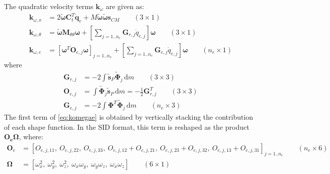 \documentclass[wes, manuscript]{copernicus}
\renewcommand{\d}{\mathrm{d}}
\renewcommand{\v}[1]{\boldsymbol{#1}}
\newcommand{\m}[1]{\boldsymbol{#1}}
\newcommand{\M} {{\m{M}}}
\newcommand{\stil}  {\m{\tilde{s}}}
\renewcommand{\d}{\mathrm{d}}
\newcommand{\dm}{\d{m}}
\begin{document}
The quadratic velocity terms $\v{k}_\omega$  are given as:
\begin{align}
  \v{k}_{\omega, x}       & = 2\v{\tilde{\omega}}  \v{C}_t^T \v{\dot{q}}_e
      + 
M\v{\tilde{\omega}} 
 \v{\tilde{\omega}} 
\v{s}_{CM}
 \qquad (3\times 1)
  \\
  \v{k}_{\omega, \theta}  & = \v{\tilde{\omega}}\M_{\theta\theta}\v{\omega}         
   +\left[\sum\limits_{j=1..n_e}  \v{G}_{r,j} \dot{q}_{e,j}\right] \v{\omega}
 \qquad (3\times 1)
  \\
  \v{k}_{\omega, e}   & =  \left[  \v{\omega}^T \m{O}_{e,j}\v{\omega}\right]_{j=1..n_e} 
  + 
    \left[\sum\limits_{j=1..n_e}   \m{G}_{e,j} \dot{q}_{e,j}\right] \v{\omega}
 \qquad (n_e\times 1)
 \label{eq:komegae}
\end{align}
where
\begin{align}
    \m{G}_{r,j} &=  -2 \int   \stil_P \m{\tilde{\Phi}}_j \,\dm \qquad (3\times 3) 
        \\
    \m{O}_{e,j} &=  \int  \m{\tilde{\Phi}}_j \stil_P\,\dm = -\frac{1}{2}  \m{G}_{r,j}^T  \qquad (3\times 3) 
    \\
    \m{G}_{e,j} &=  -2 \int  \m{\Phi}^T \m{\tilde{\Phi}}_j \,\dm \qquad (n_e\times 3) 
\end{align}
The first term of \autoref{eq:komegae} is obtained by vertically stacking the contribution of each shape function.
In the SID format, this term is reshaped as the product $\m{O_e}\v{\Omega}$, where: 
\begin{align}
  \m{O}_e &= \left[O_{e,j,11},\ O_{e,j,22},\  O_{e,j,33},\ O_{e,j,12}+O_{e,j,21},\ O_{e,j,23}+O_{e,j,32},\ O_{e,j,13}+O_{e,j,31}\right]_{j=1..n_e}  \qquad (n_e\times 6)
       \\
 \v{\Omega} &=  \left[\omega_x^2,\ \omega_y^2,\ \omega_z^2,\ \omega_x \omega_y,\ \omega_y \omega_z,\ \omega_x \omega_z \right] \qquad (6\times 1)
\end{align}
\end{document}
